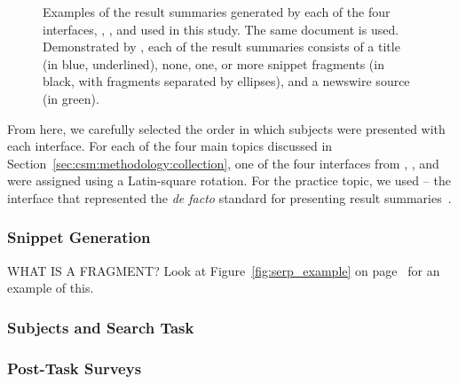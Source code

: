 \begin{figure}[t!]
    \centering
    \caption[Examples of result summaries from the four interfaces]{Examples of the result summaries generated by each of the four interfaces, , ,  and  used in this study. The same document is used. Demonstrated by \searchlogo, each of the result summaries consists of a title (in blue, underlined), none, one, or more snippet fragments (in black, with fragments separated by ellipses), and a newswire source (in green).}
    \label{fig:interface_snippets}
\end{figure}

From here, we carefully selected the order in which subjects were presented with each interface. For each of the four main topics discussed in Section~\ref{sec:csm:methodology:collection}, one of the four interfaces from , ,  and  were assigned using a Latin-square rotation. For the practice topic, we used  -- the interface that represented the \emph{de facto} standard for presenting result summaries~\citep{hearst2009_search}.

\subsubsection{Snippet Generation}
WHAT IS A FRAGMENT? Look at Figure~\ref{fig:serp_example} on page~\pageref{fig:serp_example} for an example of this.

\subsubsection{Subjects and Search Task}

\subsubsection{Post-Task Surveys}


